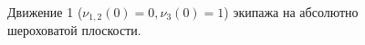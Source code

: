 \begin{figure}[htb]
    \caption{Движение 1 ($\nu_{1,2}(0) = 0, \nu_3(0) = 1$) экипажа на абсолютно шероховатой плоскости.}
    \label{fig:self_rot}
\end{figure}


\newpage


